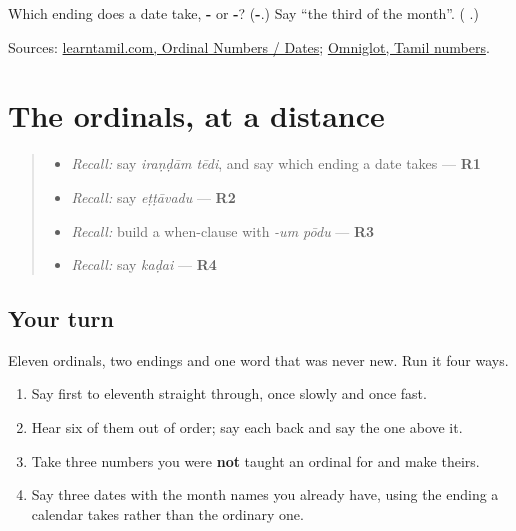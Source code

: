 \begin{tcolorbox}[breakable,colback=teal!4,colframe=teal!35!black,title={Before you move on}]
Which ending does a date take, \textbf{-} or \textbf{-}? (\textbf{-}.) Say \textquotedblleft{}the third of the month\textquotedblright{}. (\textbf{ }.)

Sources: \href{https://www.learntamil.com/part1/ch02/ordinal-numbers-dates/}{learntamil.com, Ordinal Numbers / Dates}; \href{https://www.omniglot.com/language/numbers/tamil.htm}{Omniglot, Tamil numbers}.
\end{tcolorbox}
\section[Practice]{The ordinals, at a distance}

\label{lesson:TA-R83-ordinal-recall}



\begin{quote}
\begin{itemize}
\raggedright
  \item \emph{Recall:} say \emph{iraṇḍām tēdi}, and say which ending a date takes — \textbf{R1}
  \item \emph{Recall:} say \emph{eṭṭāvadu} — \textbf{R2}
  \item \emph{Recall:} build a when-clause with \emph{-um pōdu} — \textbf{R3}
  \item \emph{Recall:} say \emph{kaḍai} — \textbf{R4}
\end{itemize}
\end{quote}

\subsection*{Your turn}
Eleven ordinals, two endings and one word that was never new. Run it four ways.

\begin{enumerate}
\raggedright
  \item Say first to eleventh straight through, once slowly and once fast.
  \item Hear six of them out of order; say each back and say the one above it.
  \item Take three numbers you were \textbf{not} taught an ordinal for and make theirs.
  \item Say three dates with the month names you already have, using the ending a calendar takes rather than the ordinary one.
\end{enumerate}

